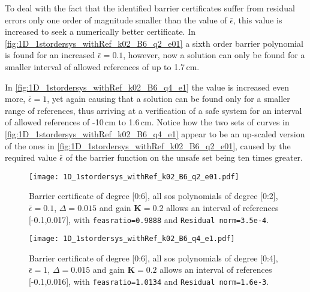 To deal with the fact that the identified barrier certificates suffer from residual errors only one order of magnitude smaller than the value of $\bar{\epsilon}$, this value is increased to seek a numerically better certificate. In \autoref{fig:1D_1stordersys_withRef_k02_B6_q2_e01} a sixth order barrier polynomial is found for an increased $\bar{\epsilon}=0.1$, however, now a solution can only be found for a smaller interval of allowed references of up to 1.7\,cm.

In \autoref{fig:1D_1stordersys_withRef_k02_B6_q4_e1} the value is increased even more, $\bar{\epsilon}=1$, yet again causing that a solution can be found only for a smaller range of references, thus arriving at a verification of a safe system for an interval of allowed references of -10\,cm  to 1.6\,cm. Notice how the two sets of  curves in  \autoref{fig:1D_1stordersys_withRef_k02_B6_q4_e1} appear to be an up-scaled version of the ones in \autoref{fig:1D_1stordersys_withRef_k02_B6_q2_e01}, caused by the required value $\bar{\epsilon}$ of the barrier function on the unsafe set being ten times greater.

\begin{figure}[htbp]
\centering
\texttt{[image: 1D\_1stordersys\_withRef\_k02\_B6\_q2\_e01.pdf]}
\caption{Barrier certificate of degree [0:6], all \gls{sos} polynomials of degree [0:2], $\bar{\epsilon}=0.1$, $\Delta=0.015$ and gain $\textbf{K}=0.2$ allows an interval of references [-0.1,0.017], with \texttt{feasratio=0.9888} and \texttt{Residual norm=3.5e-4}.}
\label{fig:1D_1stordersys_withRef_k02_B6_q2_e01}
\end{figure}

\begin{figure}[htbp]
\centering
\texttt{[image: 1D\_1stordersys\_withRef\_k02\_B6\_q4\_e1.pdf]}
\caption{Barrier certificate of degree [0:6], all \gls{sos} polynomials of degree [0:4], $\bar{\epsilon}=1$, $\Delta=0.015$ and gain $\textbf{K}=0.2$ allows an interval of references [-0.1,0.016], with \texttt{feasratio=1.0134} and \texttt{Residual norm=1.6e-3}.}
\label{fig:1D_1stordersys_withRef_k02_B6_q4_e1}
\end{figure}


